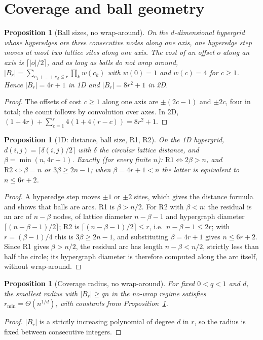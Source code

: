 \documentclass[pdflatex,sn-mathphys-num]{sn-jnl}
\theoremstyle{thmstyleone}%
\newtheorem{proposition}[theorem]{Proposition}
\theoremstyle{thmstylethree}%
\theoremstyle{thmstyletwo}%
\begin{document}
\section{Coverage and ball geometry}
\label{sec:B}

\begin{proposition}[Ball sizes, no wrap-around]
\label{prop:B1}
On the $d$-dimensional hypergrid whose hyperedges are three consecutive
nodes along one axis, one hyperedge step moves at most two lattice sites
along one axis. The cost of an offset $o$ along an axis is
$\lceil|o|/2\rceil$, and as long as balls do not wrap around,
$|B_r|=\sum_{c_1+\dots+c_d\le r}\prod_k w(c_k)$ with $w(0)=1$ and
$w(c)=4$ for $c\ge1$. Hence $|B_r|=4r+1$ in 1D and $|B_r|=8r^2+1$ in 2D.
\end{proposition}
\begin{proof}
The offsets of cost $c\ge1$ along one axis are $\pm(2c-1)$ and $\pm2c$,
four in total; the count follows by convolution over axes. In 2D,
$(1+4r)+\sum_{c=1}^{r}4(1+4(r-c))=8r^2+1$.
\end{proof}

\begin{proposition}[1D: distance, ball size, R1, R2]
\label{prop:B2}
On the 1D hypergrid, $d(i,j)=\lceil\delta(i,j)/2\rceil$ with $\delta$ the
circular lattice distance, and $\beta=\min(n,4r+1)$. Exactly (for every
finite $n$): $\mathrm{R1}\iff2\beta>n$, and $\mathrm{R2}\iff\beta=n$ or
$3\beta\ge2n-1$; when $\beta=4r+1<n$ the latter is equivalent to
$n\le6r+2$.
\end{proposition}
\begin{proof}
A hyperedge step moves $\pm1$ or $\pm2$ sites, which gives the distance
formula and shows that balls are arcs. R1 is $\beta>n/2$. For R2 with
$\beta<n$: the residual is an arc of $n-\beta$ nodes, of lattice diameter
$n-\beta-1$ and hypergraph diameter $\lceil(n-\beta-1)/2\rceil$; R2 is
$\lceil(n-\beta-1)/2\rceil\le r$, i.e.\ $n-\beta-1\le2r$; with
$r=(\beta-1)/4$ this is $3\beta\ge2n-1$, and substituting $\beta=4r+1$
gives $n\le6r+2$. Since R1 gives $\beta>n/2$, the residual arc has length
$n-\beta<n/2$, strictly less than half the circle; its hypergraph diameter
is therefore computed along the arc itself, without wrap-around.
\end{proof}

\begin{proposition}[Coverage radius, no wrap-around]
\label{prop:B3}
For fixed $0<q<1$ and $d$, the smallest radius with $|B_r|\ge qn$ in the
no-wrap regime satisfies $r_{\min}=\Theta(n^{1/d})$, with constants from
Proposition~\ref{prop:B1}.
\end{proposition}
\begin{proof}
$|B_r|$ is a strictly increasing polynomial of degree $d$ in $r$, so the
radius is fixed between consecutive integers.
\end{proof}
\end{document}
